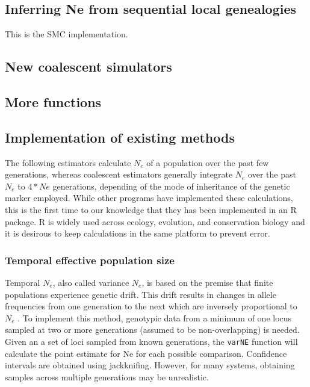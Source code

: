 \documentclass[english,titlepage]{article}
\begin{document}
\subsection*{Inferring Ne from sequential local genealogies}
This is the SMC implementation.

\subsection*{New coalescent simulators}
\citep{Palacios2013}

\subsection*{More functions}
\citep{Hein2005}


\subsection*{Implementation of existing methods}

The following estimators calculate $N_e$ of a population over the past few generations, whereas coalescent estimators generally integrate $N_e$ over the past $N_e$ to $4*Ne$ generations, depending of the mode of inheritance of the genetic marker employed. While other programs have implemented these calculations, this is the first time to our knowledge that they has been implemented in an R package. R is widely used across ecology, evolution, and conservation biology and it is desirous to keep calculations in the same platform to prevent error.

\subsubsection*{Temporal effective population size}

Temporal $N_e$, also called variance $N_e$, is based on the premise that finite populations experience genetic drift. This drift results in changes in allele frequencies from one generation to the next which are inversely proportional to $N_e$ \citep{Nei1981}. To implement this method, genotypic data from a minimum of one locus sampled at two or more generations (assumed to be non-overlapping) is needed.  Given an a set of loci sampled from known generations, the \texttt{varNE} function will calculate the point estimate for Ne for each possible comparison. Confidence intervals are obtained using jackknifing. However, for many systems, obtaining samples across multiple generations may be unrealistic.
\end{document}

